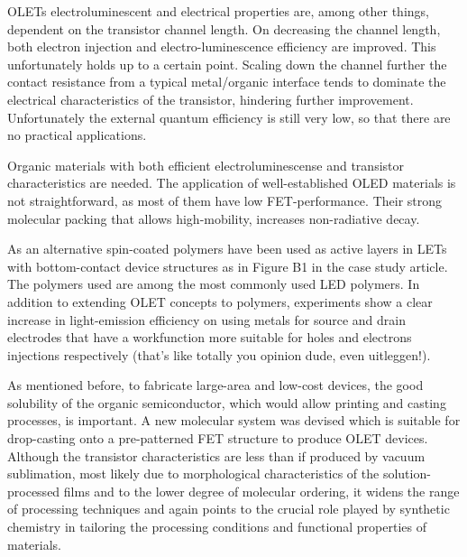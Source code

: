 OLETs electroluminescent and electrical properties are, among other things, dependent on the transistor channel length. On decreasing the channel length, both electron injection and electro-luminescence efficiency are improved. This unfortunately holds up to a certain point. Scaling down the channel further the contact resistance from a typical metal/organic interface tends to dominate the electrical characteristics of the transistor, hindering further improvement. Unfortunately the external quantum efficiency is still very low, so that there are no practical applications. 

Organic materials with both efficient electroluminescense and transistor characteristics are needed. The application of well-established OLED materials is not straightforward, as most of them have low FET-performance. Their strong molecular packing that allows high-mobility, increases non-radiative decay.

As an alternative spin-coated polymers have been used as active layers in LETs with bottom-contact device structures as in Figure B1 in the case study article. The polymers used are among the most commonly used LED polymers. In addition to extending OLET concepts to polymers, experiments show a clear increase in light-emission efficiency on using metals for source and drain electrodes that have a workfunction more suitable for holes and electrons injections respectively (that's like totally you opinion dude, even uitleggen!).

As mentioned before, to fabricate large-area and low-cost devices, the good solubility of the organic semiconductor, which would allow printing and casting processes, is important. A new molecular system was devised which is suitable for drop-casting onto a pre-patterned FET structure to produce OLET devices. Although the transistor characteristics are less than if produced by vacuum sublimation, most likely due to morphological characteristics of the solution-processed films and to the lower degree of molecular ordering, it widens the range of processing techniques and again points to the crucial role played by synthetic chemistry in tailoring the processing conditions and functional properties of materials.